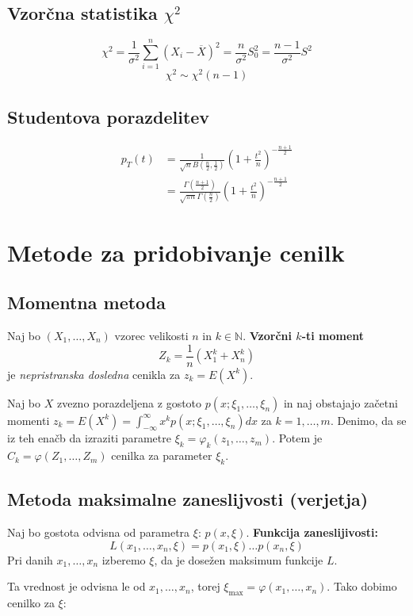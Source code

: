 \begin{multicols}{5}
\subsection{Vzorčna statistika $\chi^2$}

\[ \chi^2 = \frac{1}{\sigma^2} \sum_{i=1}^{n} (X_i - \overline{X})^2 = \frac{n}{\sigma^2}S_0^2 = \frac{n-1}{\sigma^2}S^2\]
\[ \chi^2 \sim \chi^2(n-1)\]

\subsection{Studentova porazdelitev}
\begin{align*}
    p_T(t) &= \frac{1}{\sqrt{n} B(\frac{n}{2}, \frac{1}{2} )} \left(1 + \frac{t^2}{n}\right)^{-\frac{n+1}{2}} \\
    &= \frac{\Gamma(\frac{n+1}{2})}{\sqrt{\pi n} \Gamma(\frac{n}{2})} \left(1 + \frac{t^2}{n}\right)^{-\frac{n+1}{2}}
\end{align*}

\section{Metode za pridobivanje cenilk}
\subsection{Momentna metoda}
Naj bo $(X_1, \dots, X_n)$ vzorec velikosti $n$ in $k \in \mathbb{N}$.
\textbf{Vzorčni $k$-ti moment}
\[ Z_k = \frac{1}{n}\left( X_1^k + X_n^k \right)\]
je \textit{nepristranska dosledna} cenikla za $z_k = E(X^k)$.

Naj bo $X$ zvezno porazdeljena z gostoto $p(x; \xi_1, \dots, \xi_n)$ in naj obstajajo začetni momenti 
$z_k = E(X^k) = \int_{-\infty}^{\infty} x^k p(x; \xi_1, \dots, \xi_n) dx$ za $k = 1, \dots, m$. Denimo, da se
iz teh enačb da izraziti parametre $\xi_k = \varphi_k(z_1, \dots, z_m)$. Potem je $C_k = \varphi(Z_1, \dots, Z_m)$ cenilka za parameter $\xi_k$.

\subsection{Metoda maksimalne zaneslijvosti (verjetja)}
Naj bo gostota odvisna od parametra $\xi$: $p(x, \xi)$.
\textbf{Funkcija zaneslijivosti:}
\[L(x_1, \dots, x_n, \xi) = p(x_1, \xi) \dots p(x_n, \xi)\]
Pri danih $x_1, \dots, x_n$ izberemo $\xi$, da je dosežen maksimum funkcije $L$.

Ta vrednost je odvisna le od $x_1, \dots, x_n$, torej $\xi_{\max} = \varphi(x_1, \dots, x_n)$. Tako dobimo cenilko za $\xi$:


\end{multicols}
